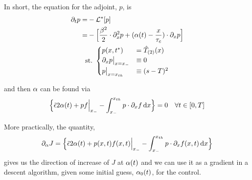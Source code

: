 \documentclass{article}
\begin{document}
In short, the equation for the adjoint, $p$, is 
\begin{equation}
\begin{gathered}
\begin{aligned}
{\partial}_t p =& - { { \mathcal{L} }^* }[p]
\\
		=&  
			- \Big[ \frac{{\beta}^2 }{2}\cdot {\partial}^2_x p +  
			({\alpha}(t)- \frac{x}{{ \tau_{c} }})  \cdot {\partial}_x p \Big] 
\end{aligned}
\\
{ \textrm{st.\ } }  
\begin{cases}
	p(x,{ t^* }) &= { \hat{T}_{(2)} }(x)
	\\ 
	{\partial}_x p  \big|_{x={ x_{-} }} &\equiv 0
	\\
	p \big|_{x={ x_{th} }} &\equiv (s-T)^2
\end{cases}
\label{eq:adjoint_pde_OU}
\end{gathered}
\end{equation} 

and then ${\alpha}$ can be found via
\begin{equation}
\Big\{
 \tilde{{\epsilon}}  2 {\alpha}(t)
+ p f \Big|_{ x_{-} }
- \int _{ x_{-} }^{ x_{th} } p \cdot {\partial}_x f \, \mathrm{d} x 
\Big\} = 0
\quad \forall t \in [0,T]
\label{eq:J_necessary_condition}
\end{equation}

More practically, the quantity, 
$${\partial}_{\alpha} J =  \Big\{
 \tilde{{\epsilon}}  2 {\alpha}(t)
+ p(x,t) f(x,t) \Big|_{ x_{-} }
- \int _{ x_{-} }^{ x_{th} } p \cdot {\partial}_x f(x,t) \, \mathrm{d} x 
\Big\}
$$
gives us the direction of increase of $J$ at ${\alpha}(t)$
and we can use it as a gradient in a descent algorithm, given some initial
guess, ${\alpha}_0(t)$, for the control.
\end{document}
